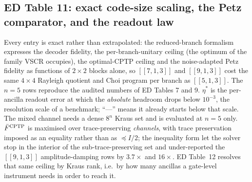 \documentclass[10pt,a4paper]{article}
\begin{document}
\subsection*{ED Table 11: exact code-size scaling, the Petz comparator, and the
readout law}
Every entry is exact rather than extrapolated: the reduced-branch formalism
expresses the decoder fidelity, the per-branch-unitary ceiling (the optimum of
the family VSCR occupies), the optimal-CPTP ceiling and the noise-adapted Petz
fidelity as functions of $2\times2$ blocks alone, so $[\![7,1,3]\!]$ and
$[\![9,1,3]\!]$ cost the same $4\times4$ Rayleigh quotient and Choi program per
branch as $[\![5,1,3]\!]$. The $n=5$ rows reproduce the audited numbers of ED
Tables 7 and 9. $\eta^\ast$ is the per-ancilla readout error at which the
\emph{absolute} headroom drops below $10^{-3}$, the resolution scale of a
benchmark; ``---'' means it already starts below that scale. The mixed channel
needs a dense $8^n$ Kraus set and is evaluated at $n=5$ only.
$\bar F^{\rm CPTP}$ is maximised over trace-preserving \emph{channels}, with
trace preservation imposed as an equality rather than as $\preceq I/2$; the
inequality form let the solver stop in the interior of the sub-trace-preserving
set and under-reported the $[\![9,1,3]\!]$ amplitude-damping rows by $3.7\times$
and $16\times$. ED Table~12 resolves that same ceiling by Kraus rank, i.e.\ by
how many ancillas a gate-level instrument needs in order to reach it.
\end{document}
